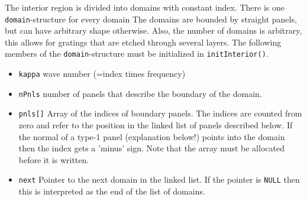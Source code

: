 \documentclass{article}
\begin{document}
The interior region is divided into domains with constant index.
There is one \texttt{domain}-structure for every domain The domains are
bounded by straight panels, but can have arbitrary shape otherwise.
Also, the number of domains is arbitrary, this allows for gratings
that are etched through several layers. The following members of the
\texttt{domain}-structure must be initialized in
\texttt{initInterior()}.
\begin{itemize}
\item[]\texttt{kappa} wave number (=index times frequency)
\item[]\texttt{nPnls} number of panels that describe the boundary of
  the domain. 
\item[]\texttt{pnls[]} Array of the indices of boundary panels. The
  indices are counted from zero and refer to the position in the
  linked list of panels described below. If the normal of a type-1
  panel (explanation below!) points into the domain then the index
  gets a 'minus' sign. Note that the array must be
  allocated before it is written.
\item[]\texttt{next} Pointer to the next domain in the linked list. If
  the pointer is \texttt{NULL} then this is interpreted as the end of
  the list of domains.
\end{itemize}
\end{document}
